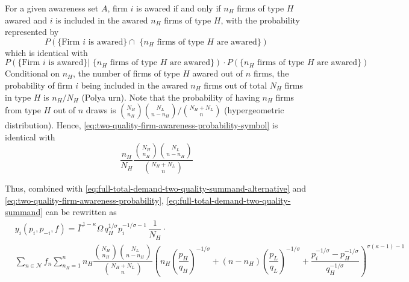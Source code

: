 \documentclass[12pt]{article}
\begin{document}
For a given awareness set $A$, firm $i$ is awared if and only if $n_H$ firms of type $H$ awared and $i$ is included in the awared $n_H$ firms of type $H$, with the probability represented by
\begin{equation}\label{eq:two-quality-firm-awareness-probability-symbol}
P( \text{\{Firm $i$ is awared\} $\cap$ \{$n_H$ firms of type $H$ are awared\}})
\end{equation}
which is identical with
 \begin{equation}
P( \text{\{Firm $i$ is awared\} | \{$n_H$ firms of type $H$ are awared\}}) \cdot P( \text{\{$n_H$ firms of type $H$ are awared\}}) 
 \end{equation}
Conditional on $n_H$, the number of firms of type $H$ awared out of $n$ firms, the probability of firm $i$ being included in the awared $n_H$ firms out of total $N_H$ firms in type $H$ is $n_H / N_H$ (Polya urn). Note that the probability of having $n_H$ firms from type $H$ out of $n$ draws is $\binom{N_H}{n_H} \binom{N_L}{n - n_H} / \binom{N_H + N_L}{n}$ (hypergeometric distribution). Hence, \eqref{eq:two-quality-firm-awareness-probability-symbol} is identical with
\begin{equation}\label{eq:two-quality-firm-awareness-probability}
\dfrac{n_H}{N_H}
\dfrac{\binom{N_H}{n_H} \binom{N_L}{n - n_H}}{\binom{N_H + N_L}{n}} 
\end{equation}

Thus, combined with \eqref{eq:full-total-demand-two-quality-summand-alternative} and \eqref{eq:two-quality-firm-awareness-probability},  \eqref{eq:full-total-demand-two-quality-summand} can be rewritten as
\begin{equation}\label{eq:full-total-demand-two-quality-alternative}
\begin{aligned}
& y_{i}(p_i, p_{-i}, f) 
=  \bar{\Gamma}^{1-\kappa}\Omega \, q_H^{1/\sigma}p_i^{-1/\sigma - 1}\, \dfrac{1}{N_H} \cdot \\ 
&\sum_{n \in \mathcal{N} } f_n   \sum_{n_H =1}^n  
n_H \dfrac{\binom{N_H}{n_H} \binom{N_L}{n - n_H}}{\binom{N_H + N_L}{n}}
\left( 
n_H \left( \dfrac{p_{H}}{q_{H}}   \right)^{-1/\sigma} +  
(n - n_H) \left( \dfrac{p_{L}}{q_{L}}   \right)^{-1/\sigma} +
\dfrac{p_i^{-1/\sigma} - p^{-1/\sigma}_{H} }{ q_H^{-1/\sigma }} 
\right)^{\sigma (\kappa - 1)-1}
\end{aligned}
\end{equation}
\end{document}
